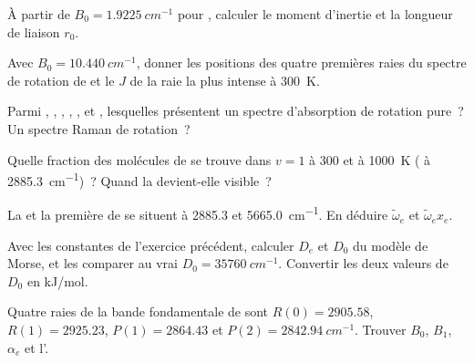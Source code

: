\begin{exercise}[$\star$]\label{exo:b3:rovibrational-spectroscopy:1}
À partir de $B_0 = \qty{1.9225}{cm^{-1}}$ pour , calculer
le moment d'inertie et la longueur de liaison $r_0$.
\end{exercise}

\begin{exercise}[$\star$]\label{exo:b3:rovibrational-spectroscopy:2}
Avec $B_0 = \qty{10.440}{cm^{-1}}$, donner les positions des quatre
premières raies du spectre de rotation de  et le $J$ de la
raie la plus intense à
\qty{300}{K}.
\end{exercise}

\begin{exercise}[$\star$]\label{exo:b3:rovibrational-spectroscopy:3}
Parmi , , , , ,  et
, lesquelles présentent un spectre d'absorption de rotation
pure~? Un spectre Raman de rotation~?
\end{exercise}

\begin{exercise}[$\star$]\label{exo:b3:rovibrational-spectroscopy:4}
Quelle fraction des molécules de  se trouve dans $v = 1$ à 300 et
à \qty{1000}{K} ( à \qty{2885.3}{cm^{-1}})~? Quand la
 devient-elle visible~?
\end{exercise}

\begin{exercise}[$\star\star$]\label{exo:b3:rovibrational-spectroscopy:5}
La  et la première  de
 se situent à 2885.3 et
\qty{5665.0}{cm^{-1}}. En déduire $\tilde\omega_e$ et $\tilde\omega_ex_e$.
\end{exercise}

\begin{exercise}[$\star\star$]\label{exo:b3:rovibrational-spectroscopy:6}
Avec les constantes de l'exercice précédent, calculer $D_e$ et $D_0$ du
modèle de Morse, et les comparer au vrai $D_0 = \qty{35760}{cm^{-1}}$.
Convertir les deux valeurs de
$D_0$ en \unit{kJ/mol}.
\end{exercise}

\begin{exercise}[$\star\star$]\label{exo:b3:rovibrational-spectroscopy:7}
Quatre raies de la bande fondamentale de  sont
$R(0) = 2905.58$, $R(1) = 2925.23$,
$P(1) = 2864.43$ et $P(2) = \qty{2842.94}{cm^{-1}}$. Trouver $B_0$, $B_1$,
$\alpha_e$ et
l'.
\end{exercise}

